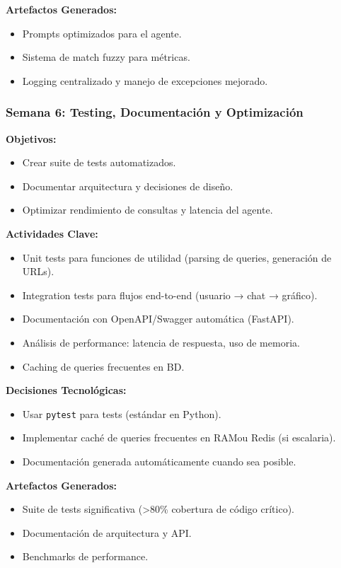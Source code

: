 \documentclass[11pt, a4paper]{report}
\begin{document}
\textbf{Artefactos Generados:}
\begin{itemize}
    \item Prompts optimizados para el agente.
    \item Sistema de match fuzzy para métricas.
    \item Logging centralizado y manejo de excepciones mejorado.
\end{itemize}

\subsubsection{Semana 6: Testing, Documentación y Optimización}

\textbf{Objetivos:}
\begin{itemize}
    \item Crear suite de tests automatizados.
    \item Documentar arquitectura y decisiones de diseño.
    \item Optimizar rendimiento de consultas y latencia del agente.
\end{itemize}

\textbf{Actividades Clave:}
\begin{itemize}
    \item Unit tests para funciones de utilidad (parsing de queries, generación de URLs).
    \item Integration tests para flujos end-to-end (usuario → chat → gráfico).
    \item Documentación con OpenAPI/Swagger automática (FastAPI).
    \item Análisis de performance: latencia de respuesta, uso de memoria.
    \item Caching de queries frecuentes en BD.
\end{itemize}

\textbf{Decisiones Tecnológicas:}
\begin{itemize}
    \item Usar \texttt{pytest} para tests (estándar en Python).
    \item Implementar caché de queries frecuentes en RAMou Redis (si escalaria).
    \item Documentación generada automáticamente cuando sea posible.
\end{itemize}

\textbf{Artefactos Generados:}
\begin{itemize}
    \item Suite de tests significativa (>80\% cobertura de código crítico).
    \item Documentación de arquitectura y API.
    \item Benchmarks de performance.
\end{itemize}
\end{document}
